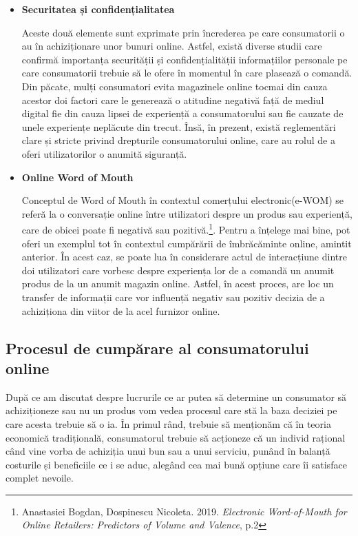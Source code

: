 \documentclass[a4paper, 12pt]{article}
\begin{document}
\begin{itemize}
		\item\textbf{Securitatea și confidențialitatea}
		
		\quad Aceste două elemente sunt exprimate prin încrederea pe care consumatorii o au în achiziționare unor bunuri online. Astfel, există diverse studii care confirmă importanța securității și confidențialității informațiilor personale pe care consumatorii trebuie să le ofere în momentul în care plasează o comandă. Din păcate, mulți consumatori evita magazinele online tocmai din cauza acestor doi factori care le generează o atitudine negativă față de mediul digital fie din cauza lipsei de experiență a consumatorului sau fie cauzate de unele experiențe neplăcute din trecut. Însă, în prezent, există reglementări clare și stricte privind drepturile consumatorului online, care au rolul de a oferi utilizatorilor o anumită siguranță.
\newpage
		\item\textbf{Online Word of Mouth} 
		
		\quad Conceptul de Word of Mouth în contextul comerțului electronic(e-WOM) se referă la o conversație online între utilizatori despre un produs sau experiență, care de obicei poate fi negativă sau pozitivă.\footnote{Anastasiei Bogdan, Dospinescu Nicoleta. 2019. \textit{Electronic Word-of-Mouth for Online Retailers:
			Predictors of Volume and Valence}, p.2}. Pentru a înțelege mai bine, pot oferi un exemplul tot în contextul cumpărării de îmbrăcăminte online, amintit anterior. În acest caz, se poate lua în considerare actul de interacțiune dintre doi utilizatori care vorbesc despre experiența lor de a comandă un anumit produs de la un anumit magazin online. Astfel, în acest proces, are loc un transfer de informații care vor influență negativ sau pozitiv decizia de a achiziționa din viitor de la acel furnizor online.
		
	\end{itemize}

		\subsection{Procesul de cumpărare al consumatorului online}
		\quad\quad După ce am discutat despre lucrurile ce ar putea să determine un consumator să achiziționeze sau nu un produs vom vedea procesul care stă la baza deciziei pe care acesta trebuie să o ia. În primul rând, trebuie să menționăm că în teoria economică tradițională, consumatorul trebuie să acționeze că un individ rațional când vine vorba de achiziția unui bun sau a unui serviciu, punând în balanță costurile și beneficiile ce i se aduc, alegând cea mai bună opțiune care îi satisface complet nevoile.
		
\end{document}
